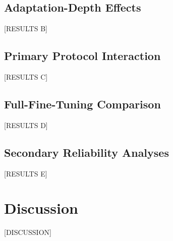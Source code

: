 \documentclass[journal]{IEEEtran}
\begin{document}
\subsection{Adaptation-Depth Effects}
[RESULTS B]

\subsection{Primary Protocol Interaction}
[RESULTS C]

\subsection{Full-Fine-Tuning Comparison}
[RESULTS D]

\subsection{Secondary Reliability Analyses}
[RESULTS E]

\section{Discussion}
[DISCUSSION]

\end{document}
